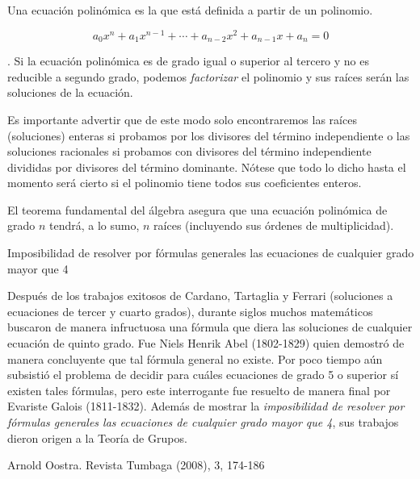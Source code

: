 \begin{definition}

Una ecuación polinómica es la que está definida a partir de un polinomio.

$$a_0x^n+a_1x^{n-1}+\cdots +a_{n-2}x^2+a_{n-1}x+a_n=0$$	
\end{definition}


\begin{theorem}
. Si la ecuación polinómica es de grado igual o superior al tercero y no es reducible a segundo grado, podemos \emph{factorizar} el polinomio y sus raíces serán las soluciones de la ecuación.

\vspace{2mm} Es importante advertir que de este modo solo encontraremos las raíces (soluciones) enteras si probamos por los divisores del término independiente o las soluciones racionales si probamos con divisores del término independiente divididas por divisores del término dominante. Nótese que todo lo dicho hasta el momento será cierto si el polinomio tiene todos sus coeficientes enteros.

\vspace{2mm} El teorema fundamental del álgebra asegura que una ecuación polinómica de grado $n$ tendrá, a lo sumo, $n$ raíces (incluyendo sus órdenes de multiplicidad).
\end{theorem}

\begin{myalertblock}{Imposibilidad de resolver por fórmulas generales las ecuaciones de cualquier grado mayor que 4}
	
	Después de los trabajos exitosos de Cardano, Tartaglia y Ferrari (soluciones a ecuaciones de tercer y cuarto grados), durante siglos muchos matemáticos buscaron de manera infructuosa una fórmula que diera las soluciones de cualquier ecuación de quinto grado. Fue Niels Henrik Abel (1802-1829) quien demostró de manera concluyente que tal fórmula general no existe. Por poco tiempo aún subsistió el problema de decidir para cuáles ecuaciones de grado 5 o superior sí existen tales fórmulas, pero este interrogante fue resuelto de manera final por Evariste Galois (1811-1832). Además de mostrar la \emph{imposibilidad de resolver por fórmulas generales las ecuaciones de cualquier grado mayor que 4}, sus trabajos dieron origen a la Teoría de Grupos.

\begin{flushright}
 Arnold Oostra. Revista Tumbaga (2008), 3, 174-186	
\end{flushright}
\end{myalertblock}


